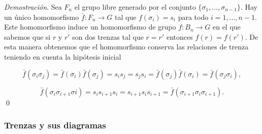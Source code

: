 \documentclass[12pt]{article}
\theoremstyle{definition}
\begin{document}
\textit{Demostración}. Sea $F_n$ el grupo libre generado por el conjunto $\{\sigma_1,...,\sigma_{n-1}\}$. Hay un único homomorfismo $\bar{f}:F_n\rightarrow G$ tal que $f(\sigma_i)= s_i$ para todo $i=1,...,n-1$. Este homomorfismo induce un homomorfismo de grupo $f:B_n\rightarrow G$ en el que sabemos que si $r$ y $r'$ son dos trenzas tal que $r = r'$ entonces $f(r) = f(r')$. De esta manera obtenemos que el homomorfismo conserva las relaciones de trenza teniendo en cuenta la hipótesis inicial

$$\bar{f}(\sigma_i\sigma_{j})=\bar{f}(\sigma_i)\bar{f}(\sigma_{j})=s_is_j=s_js_i=\bar{f}(\sigma_j)\bar{f}(\sigma_{i})=\bar{f}(\sigma_j\sigma_{i}),$$

$$\bar{f}(\sigma_i\sigma_{i+1}\sigma{i}) = s_is_{i+1}s_i=s_{i+1}s_is_{i+1} = \bar{f}(\sigma_{i+1}\sigma_i\sigma_{i+1}).$$\qed 



\subsubsection{Trenzas y sus diagramas}
\end{document}
